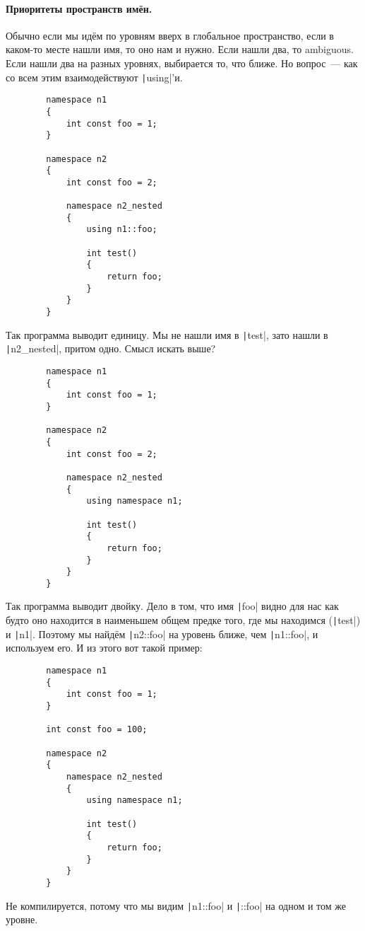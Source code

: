 \documentclass{article}
\begin{document}
    \paragraph{Приоритеты пространств имён.}
    Обычно если мы идём по уровням вверх в глобальное пространство, если в каком-то месте нашли имя, то оно нам и нужно. Если нашли два, то ambiguous. Если нашли два на разных уровнях, выбирается то, что ближе. Но вопрос~--- как со всем этим взаимодействуют \texttt|using|'и.
    \begin{verbatim}
        namespace n1
        {
            int const foo = 1;
        }

        namespace n2
        {
            int const foo = 2;

            namespace n2_nested
            {
                using n1::foo;

                int test()
                {
                    return foo;
                }
            }
        }
    \end{verbatim}
    Так программа выводит единицу. Мы не нашли имя в \texttt|test|, зато нашли в \texttt|n2_nested|, притом одно. Смысл искать выше?
    \begin{verbatim}
        namespace n1
        {
            int const foo = 1;
        }

        namespace n2
        {
            int const foo = 2;

            namespace n2_nested
            {
                using namespace n1;

                int test()
                {
                    return foo;
                }
            }
        }
    \end{verbatim}
    Так программа выводит двойку. Дело в том, что имя \texttt|foo| видно для нас как будто оно находится в наименьшем общем предке того, где мы находимся (\texttt|test|) и \texttt|n1|. Поэтому мы найдём \texttt|n2::foo| на уровень ближе, чем \texttt|n1::foo|, и используем его. И из этого вот такой пример:
    \begin{verbatim}
        namespace n1
        {
            int const foo = 1;
        }

        int const foo = 100;

        namespace n2
        {
            namespace n2_nested
            {
                using namespace n1;

                int test()
                {
                    return foo;
                }
            }
        }
    \end{verbatim}
    Не компилируется, потому что мы видим \texttt|n1::foo| и \texttt|::foo| на одном и том же уровне.
\end{document}
